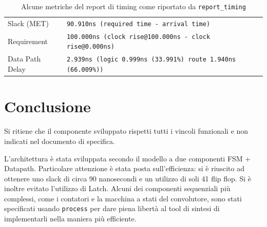 \documentclass[a4paper,11pt]{article}
\begin{document}
\begin{table}[H]
  \centering
  \begin{tabular}{l l}
    Slack (MET)     & \texttt{90.910ns (required time - arrival time)} \\
    Requirement     & \texttt{100.000ns (clock rise@100.000ns - clock rise@0.000ns)} \\
    Data Path Delay & \texttt{2.939ns (logic 0.999ns (33.991\%)  route 1.940ns (66.009\%))}\\
  \end{tabular}
  \caption{Alcune metriche del report di timing come riportato da \texttt{report\_timing}}%
  \label{tab:report-timing}
\end{table}

\section{Conclusione}

Si ritiene che il componente sviluppato rispetti tutti i vincoli funzionali e
non indicati nel documento di specifica.

L'architettura è stata sviluppata secondo il modello a due componenti FSM +
Datapath. Particolare attenzione è stata posta sull'efficienza: si è riuscito ad
ottenere uno slack di circa 90 nanosecondi e un utilizzo di soli 41 flip flop.
Si è inoltre evitato l'utilizzo di Latch. Alcuni dei componenti sequenziali più
complessi, come i contatori e la macchina a stati del convolutore, sono stati
specificati usando \texttt{process} per dare piena libertà al tool di sintesi di
implementarli nella maniera più efficiente.
\end{document}
